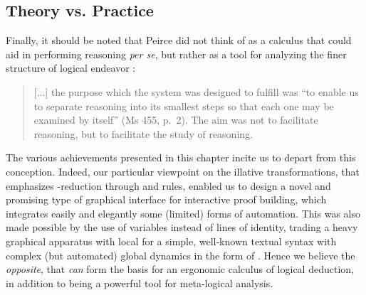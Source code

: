 \begin{scope}
\subsection{Theory vs. Practice}

Finally, it should be noted that Peirce did not think of  as a calculus that
could aid in performing reasoning \emph{per se}, but rather as a tool for
analyzing the finer structure of logical endeavor
\cite[pp.~110--111]{Roberts+1973}:
\begin{quote}
  [...] the purpose which the system was designed to fulfill was ``to enable us
to separate reasoning into its smallest steps so that each one may be examined
by itself'' (Ms 455, p.~2). The aim was not to facilitate reasoning, but to
facilitate the study of reasoning.
\end{quote}

The various achievements presented in this chapter incite us to depart from this
conception. Indeed, our particular viewpoint on the illative transformations,
that emphasizes -reduction through  and  rules, enabled us
to design a novel and promising type of graphical interface for interactive
proof building, which integrates easily and elegantly some (limited) forms of
automation. This was also made possible by the use of variables instead of lines
of identity, trading a heavy graphical apparatus with local  for
a simple, well-known textual syntax with complex (but automated) global dynamics
in the form of . Hence we believe the \emph{opposite}, that 
\emph{can} form the basis for an ergonomic calculus of logical deduction, in
addition to being a powerful tool for meta-logical analysis.


\end{scope}